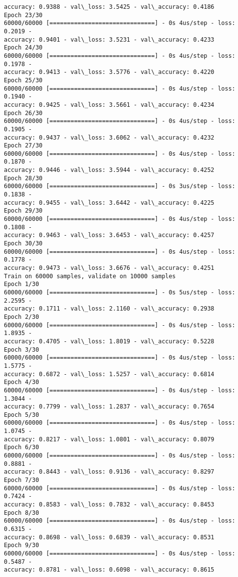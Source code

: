 \documentclass[11pt]{article}
\begin{document}
\begin{Verbatim}[commandchars=\\\{\}]
accuracy: 0.9388 - val\_loss: 3.5425 - val\_accuracy: 0.4186
Epoch 23/30
60000/60000 [==============================] - 0s 4us/step - loss: 0.2019 -
accuracy: 0.9401 - val\_loss: 3.5231 - val\_accuracy: 0.4233
Epoch 24/30
60000/60000 [==============================] - 0s 4us/step - loss: 0.1978 -
accuracy: 0.9413 - val\_loss: 3.5776 - val\_accuracy: 0.4220
Epoch 25/30
60000/60000 [==============================] - 0s 4us/step - loss: 0.1940 -
accuracy: 0.9425 - val\_loss: 3.5661 - val\_accuracy: 0.4234
Epoch 26/30
60000/60000 [==============================] - 0s 4us/step - loss: 0.1905 -
accuracy: 0.9437 - val\_loss: 3.6062 - val\_accuracy: 0.4232
Epoch 27/30
60000/60000 [==============================] - 0s 4us/step - loss: 0.1870 -
accuracy: 0.9446 - val\_loss: 3.5944 - val\_accuracy: 0.4252
Epoch 28/30
60000/60000 [==============================] - 0s 3us/step - loss: 0.1838 -
accuracy: 0.9455 - val\_loss: 3.6442 - val\_accuracy: 0.4225
Epoch 29/30
60000/60000 [==============================] - 0s 4us/step - loss: 0.1808 -
accuracy: 0.9463 - val\_loss: 3.6453 - val\_accuracy: 0.4257
Epoch 30/30
60000/60000 [==============================] - 0s 4us/step - loss: 0.1778 -
accuracy: 0.9473 - val\_loss: 3.6676 - val\_accuracy: 0.4251
Train on 60000 samples, validate on 10000 samples
Epoch 1/30
60000/60000 [==============================] - 0s 5us/step - loss: 2.2595 -
accuracy: 0.1711 - val\_loss: 2.1160 - val\_accuracy: 0.2938
Epoch 2/30
60000/60000 [==============================] - 0s 4us/step - loss: 1.8935 -
accuracy: 0.4705 - val\_loss: 1.8019 - val\_accuracy: 0.5228
Epoch 3/30
60000/60000 [==============================] - 0s 4us/step - loss: 1.5775 -
accuracy: 0.6872 - val\_loss: 1.5257 - val\_accuracy: 0.6814
Epoch 4/30
60000/60000 [==============================] - 0s 4us/step - loss: 1.3044 -
accuracy: 0.7799 - val\_loss: 1.2837 - val\_accuracy: 0.7654
Epoch 5/30
60000/60000 [==============================] - 0s 4us/step - loss: 1.0745 -
accuracy: 0.8217 - val\_loss: 1.0801 - val\_accuracy: 0.8079
Epoch 6/30
60000/60000 [==============================] - 0s 4us/step - loss: 0.8881 -
accuracy: 0.8443 - val\_loss: 0.9136 - val\_accuracy: 0.8297
Epoch 7/30
60000/60000 [==============================] - 0s 4us/step - loss: 0.7424 -
accuracy: 0.8583 - val\_loss: 0.7832 - val\_accuracy: 0.8453
Epoch 8/30
60000/60000 [==============================] - 0s 4us/step - loss: 0.6315 -
accuracy: 0.8698 - val\_loss: 0.6839 - val\_accuracy: 0.8531
Epoch 9/30
60000/60000 [==============================] - 0s 4us/step - loss: 0.5487 -
accuracy: 0.8781 - val\_loss: 0.6098 - val\_accuracy: 0.8615

\end{Verbatim}
\end{document}
